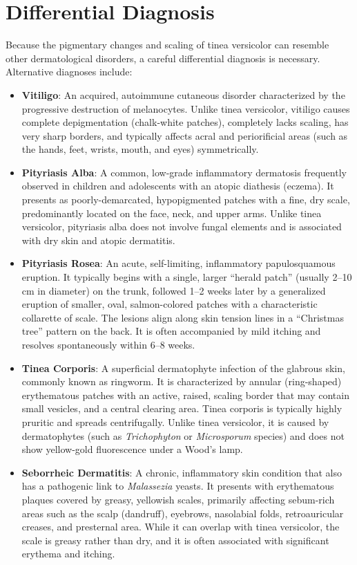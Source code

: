 \section*{Differential Diagnosis}
Because the pigmentary changes and scaling of tinea versicolor can resemble other dermatological disorders, a careful differential diagnosis is necessary. Alternative diagnoses include:

\begin{itemize}
    \item \textbf{Vitiligo}: An acquired, autoimmune cutaneous disorder characterized by the progressive destruction of melanocytes. Unlike tinea versicolor, vitiligo causes complete depigmentation (chalk-white patches), completely lacks scaling, has very sharp borders, and typically affects acral and periorificial areas (such as the hands, feet, wrists, mouth, and eyes) symmetrically.
    \item \textbf{Pityriasis Alba}: A common, low-grade inflammatory dermatosis frequently observed in children and adolescents with an atopic diathesis (eczema). It presents as poorly-demarcated, hypopigmented patches with a fine, dry scale, predominantly located on the face, neck, and upper arms. Unlike tinea versicolor, pityriasis alba does not involve fungal elements and is associated with dry skin and atopic dermatitis.
    \item \textbf{Pityriasis Rosea}: An acute, self-limiting, inflammatory papulosquamous eruption. It typically begins with a single, larger ``herald patch'' (usually 2--10 cm in diameter) on the trunk, followed 1--2 weeks later by a generalized eruption of smaller, oval, salmon-colored patches with a characteristic collarette of scale. The lesions align along skin tension lines in a ``Christmas tree'' pattern on the back. It is often accompanied by mild itching and resolves spontaneously within 6--8 weeks.
    \item \textbf{Tinea Corporis}: A superficial dermatophyte infection of the glabrous skin, commonly known as ringworm. It is characterized by annular (ring-shaped) erythematous patches with an active, raised, scaling border that may contain small vesicles, and a central clearing area. Tinea corporis is typically highly pruritic and spreads centrifugally. Unlike tinea versicolor, it is caused by dermatophytes (such as \textit{Trichophyton} or \textit{Microsporum} species) and does not show yellow-gold fluorescence under a Wood's lamp.
    \item \textbf{Seborrheic Dermatitis}: A chronic, inflammatory skin condition that also has a pathogenic link to \textit{Malassezia} yeasts. It presents with erythematous plaques covered by greasy, yellowish scales, primarily affecting sebum-rich areas such as the scalp (dandruff), eyebrows, nasolabial folds, retroauricular creases, and presternal area. While it can overlap with tinea versicolor, the scale is greasy rather than dry, and it is often associated with significant erythema and itching.

\end{itemize}
